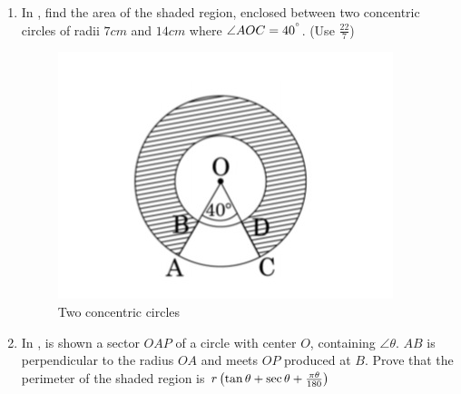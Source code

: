 \documentclass{article}
\begin{document}
\begin{enumerate}
\item In , find the area of the shaded region, enclosed between two concentric circles of radii $7cm$ and $14 cm$ where $\angle AOC = 40^{\degree}$. (Use $\frac{22}{7}$)                                                        \begin{figure}[H]                                                                                                                                          \includegraphics[width=\columnwidth]{./figs/concentriccircle.jpg}
        \caption{Two concentric circles}
	        \label{fig:concentriccircle}                                                                                                                          \end{figure}
\item In , is shown a sector $OAP$ of a circle with center $O$, containing $\angle \theta$. $AB$ is perpendicular to the radius $OA$ and meets $OP$ produced at $B$. Prove that the perimeter of the shaded region is $r\left(\tan\theta + \sec\theta +\frac{\pi\theta}{180}\right)$
     \begin{figure}[H]

\end{figure}
\end{enumerate}
\end{document}
